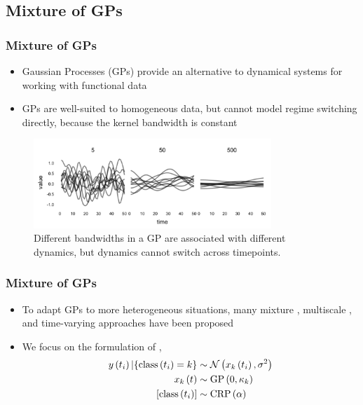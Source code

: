 \documentclass{beamer}
\begin{document}
\subsection{Mixture of GPs}
\label{subsec:mix_gps}

\begin{frame}
  \frametitle{Mixture of GPs}
  \begin{itemize}
  \item Gaussian Processes (GPs) provide an alternative to dynamical systems for
    working with functional data
  \item GPs are well-suited to homogeneous data, but cannot model regime
    switching directly, because the kernel bandwidth is constant
  \end{itemize}

  \begin{figure}[ht]
    \centering
    \includegraphics[width=0.8\textwidth]{figure/gp_bandwidths}
    \caption{Different bandwidths in a GP are associated with different dynamics,
      but dynamics cannot switch across timepoints. \label{fig:gp_bandwidths} }
  \end{figure}
\end{frame}

\begin{frame}
  \frametitle{Mixture of GPs}
\begin{itemize}
\item To adapt GPs to more heterogeneous situations, many mixture
  \citep{tresp2001mixtures, rasmussen2002infinite}, multiscale
  \citep{fox2012multiresolution, samostring}, and time-varying
  \citep{paciorek2003nonstationary} approaches have been proposed
\item We focus on the formulation of \citep{rasmussen2002infinite},
 \begin{align*}
   y\left(t_{i}\right) \vert \{ \text{class}\left(t_{i}\right) = k\} &\sim
   \mathcal{N}\left(x_{k}\left(t_{i}\right), \sigma^{2}\right) \\
   x_{k}\left(t\right) &\sim \textnormal{GP}\left(0, \kappa_{k}\right)  \\
   \left[\text{class}\left(t_{i}\right)\right] &\sim \text{CRP}\left(\alpha\right)
 \end{align*}
\end{itemize}
\end{frame}
\end{document}
